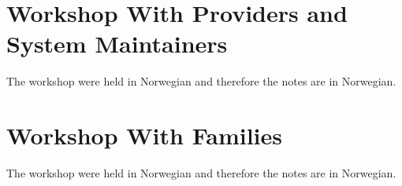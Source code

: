 \section{Workshop With Providers and System Maintainers}\label{workshop_with_providers_and_system_maintainers}The workshop were held in Norwegian and therefore the notes are in Norwegian.


















\section{Workshop With Families}
\label{workshop_with_families}
The workshop were held in Norwegian and therefore the notes are in Norwegian.













\clearpage